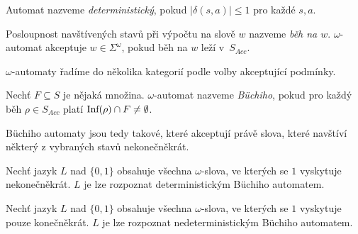 Automat nazveme {\em deterministický}, pokud
$\lvert \delta(s,a) \rvert \leq 1$ pro každé $s,a$.

Posloupnost navštívených stavů při výpočtu na slově $w$ nazveme {\em běh
na $w$}.
$\omega$-automat akceptuje $w \in \Sigma^\omega$,
pokud běh na $w$ leží v~$S_{Acc}$.

$\omega$-automaty řadíme do několika kategorií podle volby akceptující
podmínky.

\begin{definition}
    Nechť $F \subseteq S$ je nějaká množina.
    $\omega$-automat nazveme {\em Büchiho},
    pokud pro každý běh $\rho \in S_{Acc}$ platí
    $\text{Inf}(\rho) \cap F \neq \emptyset$.
\end{definition}

Büchiho automaty jsou tedy takové, které akceptují právě slova, které
navštíví některý z vybraných stavů nekonečněkrát.

\begin{example}
    Nechť jazyk $L$ nad $\{0,1\}$ obsahuje všechna $\omega$-slova,
    ve kterých se $1$ vyskytuje nekonečněkrát.
    $L$ je lze rozpoznat deterministickým Büchiho automatem.

\begin{center}
\end{center}
\end{example}

\begin{example}
    Nechť jazyk $L$ nad $\{0,1\}$ obsahuje všechna $\omega$-slova, ve
    kterých se $1$ vyskytuje pouze konečněkrát.
    $L$ je lze rozpoznat nedeterministickým Büchiho automatem.

\begin{center}
\end{center}
\end{example}

